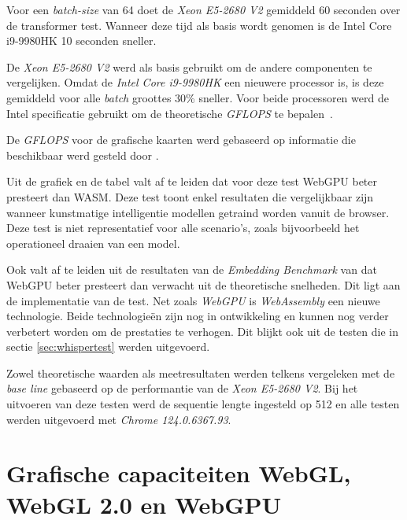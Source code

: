\bigbreak{}

Voor een \textit{batch-size} van 64 doet de \textit{Xeon E5-2680 V2} gemiddeld 60 seconden over de transformer test. Wanneer deze tijd als basis wordt genomen is de Intel Core i9-9980HK 10 seconden sneller.

\bigbreak{}

De \textit{Xeon E5-2680 V2} werd als basis gebruikt om de andere componenten te vergelijken. Omdat de \textit{Intel Core i9-9980HK} een nieuwere processor is, is deze gemiddeld voor alle \textit{batch} groottes 30\% sneller. Voor beide  processoren werd de Intel specificatie gebruikt om de theoretische \textit{GFLOPS} te bepalen~\autocite{Intel2024, Intel2024a}.

\bigbreak{}

De \textit{GFLOPS} voor de grafische kaarten werd gebaseerd op informatie die beschikbaar werd gesteld door \textcite{TechPowerUp2017, TechPowerUp2017a}.

\bigbreak{}

Uit de grafiek en de tabel valt af te leiden dat voor deze test WebGPU beter presteert dan WASM. Deze test toont enkel resultaten die vergelijkbaar zijn wanneer kunstmatige intelligentie modellen getraind worden vanuit de browser. Deze test is niet representatief voor alle scenario's, zoals bijvoorbeeld het operationeel draaien van een model.

\bigbreak{}

Ook valt af te leiden uit de resultaten van de \textit{Embedding Benchmark} van \textcite{Lochner2024} dat WebGPU beter presteert dan verwacht uit de theoretische snelheden. Dit ligt aan de implementatie van de test. Net zoals \textit{WebGPU} is \textit{WebAssembly} een nieuwe technologie. Beide technologieën zijn nog in ontwikkeling en kunnen nog verder verbetert worden om de prestaties te verhogen. Dit blijkt ook uit de testen die in sectie \ref{sec:whispertest} werden uitgevoerd.

\bigbreak{}

Zowel theoretische waarden als meetresultaten werden telkens vergeleken met de \textit{base line} gebaseerd op de performantie van de \textit{Xeon E5-2680 V2}. Bij het uitvoeren van deze testen werd de sequentie lengte ingesteld op 512 en alle testen werden uitgevoerd met \emph{Chrome 124.0.6367.93}.

\section{Grafische capaciteiten WebGL, WebGL 2.0 en WebGPU}

